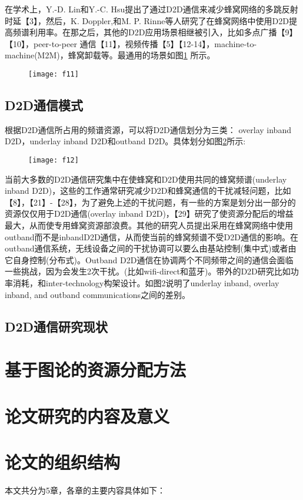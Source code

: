 \documentclass[figurelist,tablelist,algorithmlist,nomlist,masters]{seuthesix}
\begin{document}
	在学术上，Y.-D. Lin和Y.-C. Hsu提出了通过D2D通信来减少蜂窝网络的多跳反射时延【3】，然后，K. Doppler,和M. P. Rinne等人研究了在蜂窝网络中使用D2D提高频谱利用率。在那之后，其他的D2D应用场景相继被引入，比如多点广播【9】【10】，peer-to-peer 通信【11】，视频传播【5】【12-14】，machine-to-machine(M2M)，蜂窝卸载等。最通用的场景如图\ref{fig:f11} 所示。
	
	\begin{figure}[htb]
		\centering
		\texttt{[image: f11]}
		\caption{}
		\label{fig:f11}
	\end{figure}
	
	\subsection{D2D通信模式}
	根据D2D通信所占用的频谱资源，可以将D2D通信划分为三类： overlay inband D2D，underlay inband D2D和outband D2D。具体划分如图\ref{fig:f12}所示:
	\begin{figure}
		\centering
		\texttt{[image: f12]}
		\caption{}
		\label{fig:f12}
	\end{figure}
	当前大多数的D2D通信研究集中在使蜂窝和D2D使用共同的蜂窝频谱(underlay inband D2D)，这些的工作通常研究减少D2D和蜂窝通信的干扰减轻问题，比如【8】，【21】-【28】，为了避免上述的干扰问题，有一些的方案是划分出一部分的资源仅仅用于D2D通信(overlay inband D2D)，【29】研究了使资源分配后的增益最大，从而使专用蜂窝资源部浪费。其他的研究人员提出采用在蜂窝网络中使用outband而不是inbandD2D通信，从而使当前的蜂窝频谱不受D2D通信的影响。在outband通信系统，无线设备之间的干扰协调可以要么由基站控制(集中式)或者由它自身控制(分布式)。Outband D2D通信在协调两个不同频带之间的通信会面临一些挑战，因为会发生2次干扰。(比如wifi-direct和蓝牙)。带外的D2D研究比如功率消耗，和inter-technology构架设计。如图2说明了underlay inband, overlay inband, and outband communications之间的差别。
	\subsection{D2D通信研究现状}
	\section{基于图论的资源分配方法}
	\section{论文研究的内容及意义}
	\section{论文的组织结构}
	本文共分为5章，各章的主要内容具体如下：
	
\end{document}
